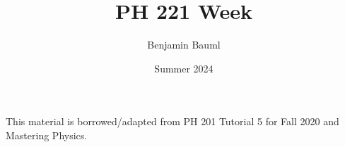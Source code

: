 \documentclass[]{article}
\title{PH 221 Week \Week}
\author{Benjamin Bauml}
\date{Summer 2024}
\newcommand{\FileDepth}{../../..}
\begin{document}
\maketitle
\begin{center}
	This material is borrowed/adapted from PH 201 Tutorial 5 for Fall 2020 and Mastering Physics.
\end{center}






\end{document}
